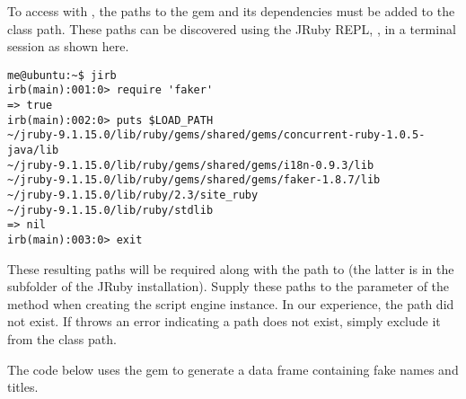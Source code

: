 To access  with , the paths to the gem and its dependencies must be added to the  class path. These paths can be discovered using the JRuby REPL, , in a terminal session as shown here.

\begin{verbatim}
me@ubuntu:~$ jirb
irb(main):001:0> require 'faker'
=> true
irb(main):002:0> puts $LOAD_PATH
~/jruby-9.1.15.0/lib/ruby/gems/shared/gems/concurrent-ruby-1.0.5-java/lib
~/jruby-9.1.15.0/lib/ruby/gems/shared/gems/i18n-0.9.3/lib
~/jruby-9.1.15.0/lib/ruby/gems/shared/gems/faker-1.8.7/lib
~/jruby-9.1.15.0/lib/ruby/2.3/site_ruby
~/jruby-9.1.15.0/lib/ruby/stdlib
=> nil
irb(main):003:0> exit
\end{verbatim}

These resulting paths will be required along with the path to  (the latter is in the  subfolder of the JRuby installation). Supply these paths to the  parameter of the   method when creating the script engine instance. In our experience, the  path did not exist. If  throws an error indicating a path does not exist, simply exclude it from the class path.

The code below uses the  gem to generate a data frame containing fake names and titles.

